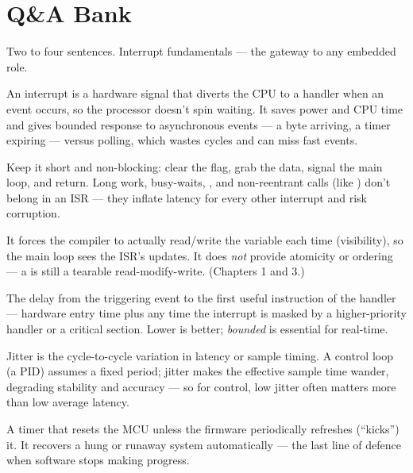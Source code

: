 \section{Q\&A Bank}

%
{Two to four sentences. Interrupt fundamentals --- the gateway to any embedded
role.}

An interrupt is a hardware signal that diverts the CPU to a handler when an
event occurs, so the processor doesn't spin waiting. It saves power and CPU
time and gives bounded response to asynchronous events --- a byte arriving, a
timer expiring --- versus polling, which wastes cycles and can miss fast
events.

Keep it short and non-blocking: clear the flag, grab the data, signal the main
loop, and return. Long work, busy-waits, , and non-reentrant
calls (like ) don't belong in an ISR --- they inflate latency for
every other interrupt and risk corruption.

It forces the compiler to actually read/write the variable each time
(visibility), so the main loop sees the ISR's updates. It does \emph{not}
provide atomicity or ordering --- a  is still a tearable
read-modify-write. (Chapters 1 and 3.)

The delay from the triggering event to the first useful instruction of the
handler --- hardware entry time plus any time the interrupt is masked by a
higher-priority handler or a critical section. Lower is better; \emph{bounded}
is essential for real-time.

Jitter is the cycle-to-cycle variation in latency or sample timing. A control
loop (a PID) assumes a fixed period; jitter makes the effective sample time
wander, degrading stability and accuracy --- so for control, low jitter often
matters more than low average latency.

A timer that resets the MCU unless the firmware periodically refreshes
(``kicks'') it. It recovers a hung or runaway system automatically --- the last
line of defence when software stops making progress.

